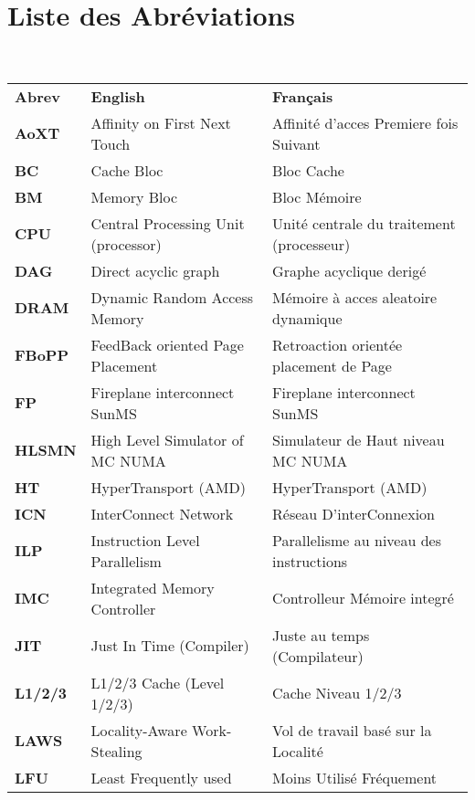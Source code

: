 ﻿\newpage
\section*{Liste des Abréviations}

\noindent \\
\begin{tabular}{ l l l }
\textbf{Abrev} 	& \textbf{English}						&	\textbf{Français} \\[1.0ex]
\textbf{AoXT}  	& Affinity on First Next Touch  		& 	Affinité d'acces Premiere fois Suivant \\[0.6ex]
\textbf{BC}  		& Cache Bloc 							& 	Bloc Cache \\[0.6ex]
\textbf{BM}  		& Memory Bloc 							& 	Bloc Mémoire \\[0.6ex]
\textbf{CPU}  	& Central Processing Unit (processor)	& 	Unité centrale du traitement (processeur) \\[0.6ex]
\textbf{DAG }  	& Direct acyclic graph 					& 	Graphe acyclique derigé  \\[0.6ex]
\textbf{DRAM }  & Dynamic Random Access Memory      & Mémoire à acces aleatoire dynamique \\[0.6ex]
\textbf{FBoPP } 	& FeedBack oriented Page Placement & Retroaction orientée placement de Page \\[0.6ex]
\textbf{FP }  		& Fireplane interconnect SunMS & Fireplane interconnect SunMS \\[0.6ex]
\textbf{HLSMN} 	& High Level Simulator of MC NUMA & Simulateur de Haut niveau MC NUMA \\[0.6ex]
\textbf{HT }  	& HyperTransport (AMD) & HyperTransport (AMD) \\[0.6ex]
\textbf{ICN }  	& InterConnect Network & Réseau D'interConnexion \\[0.6ex]
\textbf{ILP}  		& Instruction Level Parallelism & Parallelisme au niveau des instructions \\[0.6ex]
\textbf{IMC }  	& Integrated Memory Controller  & Controlleur Mémoire integré \\[0.6ex]
\textbf{JIT}  		& Just In Time (Compiler) & Juste au temps (Compilateur) \\[0.6ex]
\textbf{L1/2/3}  	& L1/2/3 Cache (Level 1/2/3) & Cache Niveau 1/2/3 \\[0.6ex]
\textbf{LAWS }  	& Locality-Aware Work-Stealing  & Vol de travail basé sur la Localité \\[0.6ex]
\textbf{LFU}  	& Least Frequently used & Moins Utilisé Fréquement  \\[0.6ex]

\end{tabular}
